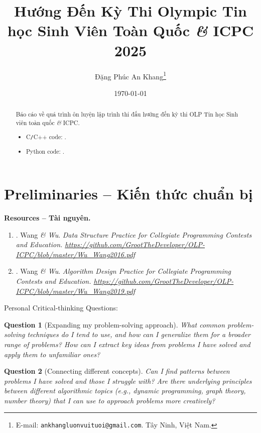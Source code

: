 \documentclass{article}
\title{Hướng Đến Kỳ Thi Olympic Tin học Sinh Viên Toàn Quốc {\it\&} ICPC 2025}
\author{Đặng Phúc An Khang\footnote{ E-mail: {\tt ankhangluonvuituoi@gmail.com}. Tây Ninh, Việt Nam.}}
\date{\today}
\newtheorem{question}{Question}
\begin{document}
\maketitle
\begin{abstract}
	Báo cáo về quá trình ôn luyện lập trình thi đấu hướng đến kỳ thi OLP Tin học Sinh viên toàn quốc {\it\&} ICPC.
	

    \begin{itemize}
        \item C{\tt/}C++ code: \url{}.
        \item Python code: \url{}.
    \end{itemize}
    
\end{abstract}
\tableofcontents


\section{Preliminaries -- Kiến thức chuẩn bị}

\textbf{\textsf{Resources -- Tài nguyên.}}
\begin{enumerate}
	\item \cite{WANG_WU2016}. {\sc Wang \it\& Wu}. \it Data Structure Practice for Collegiate Programming Contests and Education. \url{https://github.com/GrootTheDeveloper/OLP-ICPC/blob/master/Wu_Wang2016.pdf}
    	\item \cite{WANG_WU2019}. {\sc Wang \it\& Wu}. \it Algorithm Design Practice for Collegiate Programming Contests and Education. \url{https://github.com/GrootTheDeveloper/OLP-ICPC/blob/master/Wu_Wang2019.pdf}

\end{enumerate}
Personal Critical-thinking Questions:
\begin{question}[Expanding my problem-solving approach]
What common problem-solving techniques do I tend to use, and how can I generalize them for a broader range of problems?
How can I extract key ideas from problems I have solved and apply them to unfamiliar ones?

\end{question}

\begin{question}[Connecting different concepts]
	Can I find patterns between problems I have solved and those I struggle with? Are there underlying principles between different algorithmic topics (e.g., dynamic programming, graph theory, number theory) that I can use to approach problems more creatively?
\end{question}
\end{document}
